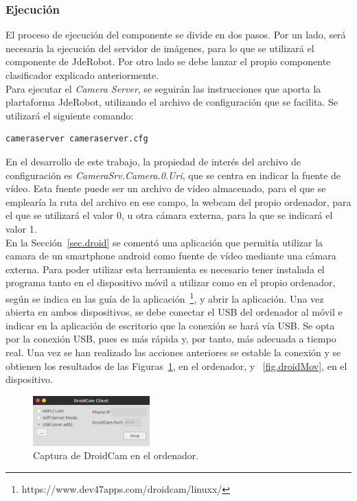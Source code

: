 \subsubsection{Ejecución}
El proceso de ejecución del componente se divide en dos pasos. Por un lado, será necesaria la ejecución del servidor de imágenes, para lo que se utilizará el componente de JdeRobot. Por otro lado se debe lanzar el propio componente clasificador explicado anteriormente.\\

Para ejecutar el \textit{Camera Server}, se seguirán las instrucciones que aporta la plartaforma JdeRobot, utilizando el archivo de configuración que se facilita. Se utilizará el siguiente comando: 
\vspace{10pt}
\begin{lstlisting}[frame=single]
	cameraserver cameraserver.cfg
\end{lstlisting}

En el desarrollo de este trabajo, la propiedad de interés del archivo de configuración es \textit{CameraSrv.Camera.0.Uri}, que se centra en indicar la fuente de vídeo. Esta fuente puede ser un archivo de vídeo almacenado, para el que se emplearía la ruta del archivo en ese campo, la webcam del propio ordenador, para el que se utilizará el valor 0, u otra cámara externa, para la que se indicará el valor 1.\\

En la Sección~\ref{sec.droid} se comentó una aplicación que permitía utilizar la camara de un smartphone android como fuente de vídeo mediante una cámara externa. Para poder utilizar esta herramienta es necesario tener instalada el programa tanto en el dispositivo móvil a utilizar como en el propio ordenador, según se indica en las guía de la aplicación~\footnote{https://www.dev47apps.com/droidcam/linuxx/}, y abrir la aplicación. Una vez abierta en ambos dispositivos, se debe conectar el USB del ordenador al móvil e indicar en la aplicación de escritorio que la conexión se hará vía USB. Se opta por la conexión USB, pues es más rápida y, por tanto, más adecuada a tiempo real. Una vez se han realizado las acciones anteriores se estable la conexión y se obtienen los resultados de las Figuras~\ref{fig.droidEsc}, en el ordenador, y ~\ref{fig.droidMov}, en el dispositivo.\\

\begin{figure}[H]
	\begin{center}
		\includegraphics[width=0.4\textwidth]{figures/droidcamEscr}
		\caption{Captura de DroidCam en el ordenador.}
		\label{fig.droidEsc}
	\end{center}
\end{figure}

